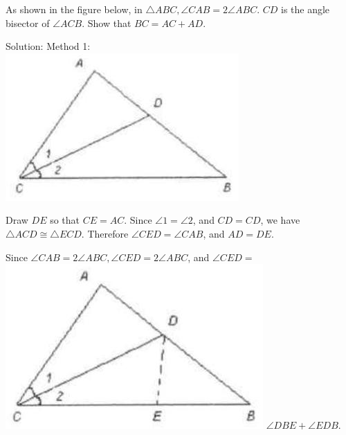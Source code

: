 \documentclass{article}
\begin{document}
As shown in the figure below, in \(\triangle A B C, \angle C A B=2 \angle A B C\). \(C D\) is the angle bisector of \(\angle A C B\). Show that \(B C=A C+A D\).

Solution:
Method 1:\\
\centering
\includegraphics[width=\textwidth]{images/056.jpg}

Draw \(D E\) so that \(C E=A C\). Since \(\angle 1=\angle 2\), and \(C D=C D\), we have \(\triangle A C D \cong \triangle E C D\). Therefore \(\angle C E D=\angle C A B\), and \(A D=D E\).

Since \(\angle C A B=2 \angle A B C, \angle C E D=2 \angle A B C\), and \(\angle C E D=\)\\
\includegraphics[width=\textwidth]{images/056(1).jpg} \(\angle D B E+\angle E D B\).
\end{document}
